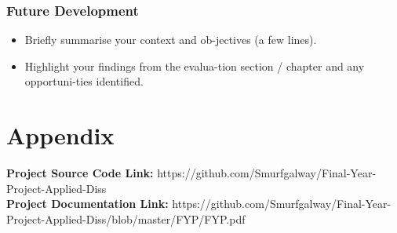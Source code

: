\subsection{Future Development}

\begin{itemize}
\item Briefly summarise your context and ob-jectives (a few lines).
\item Highlight your findings from the evalua-tion section / chapter and any opportuni-ties identified.
\end{itemize}

\chapter{Appendix}
\textbf{Project Source Code Link: } https://github.com/Smurfgalway/Final-Year-Project-Applied-Diss \\
\textbf{Project Documentation Link: } https://github.com/Smurfgalway/Final-Year-Project-Applied-Diss/blob/master/FYP/FYP.pdf\\